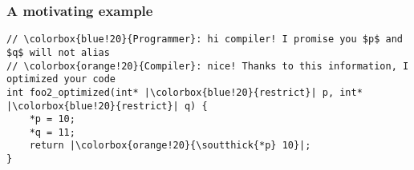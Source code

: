 \begin{frame}[fragile]
\raggedright
\frametitle{A motivating example}
\begin{verbatim}
// \colorbox{blue!20}{Programmer}: hi compiler! I promise you $p$ and $q$ will not alias
// \colorbox{orange!20}{Compiler}: nice! Thanks to this information, I optimized your code
int foo2_optimized(int* |\colorbox{blue!20}{restrict}| p, int* |\colorbox{blue!20}{restrict}| q) {   
    *p = 10;
    *q = 11;
    return |\colorbox{orange!20}{\soutthick{*p} 10}|;
}

\end{verbatim}

\begin{figure}
\centering
{}
\end{figure}

\end{frame}

